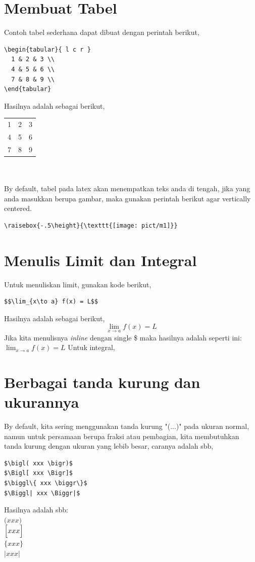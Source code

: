 \documentclass[12pt]{article}
\begin{document}
\section{Membuat Tabel}
Contoh tabel sederhana dapat dibuat dengan perintah berikut,
\begin{verbatim}
\begin{tabular}{ l c r }
  1 & 2 & 3 \\
  4 & 5 & 6 \\
  7 & 8 & 9 \\
\end{tabular}
\end{verbatim}
Hasilnya adalah sebagai berikut,\\
\begin{tabular}{ l c r }
  1 & 2 & 3 \\
  4 & 5 & 6 \\
  7 & 8 & 9 \\
\end{tabular}
\\
\\
By default, tabel pada latex akan menempatkan teks anda di tengah, jika yang anda masukkan berupa gambar, maka gunakan perintah berikut agar vertically centered.
\begin{verbatim}
\raisebox{-.5\height}{\texttt{[image: pict/m1]}}
\end{verbatim}

\section{Menulis Limit dan Integral}
Untuk menuliskan limit, gunakan kode berikut,
\begin{verbatim}
$$\lim_{x\to a} f(x) = L$$ 
\end{verbatim}
Hasilnya adalah sebagai berikut, \\
$$\lim_{x\to a} f(x) = L $$
Jika kita menulisnya \emph{inline} dengan single \$ maka hasilnya adalah seperti ini:
$\lim_{x\to a} f(x) = L$
Untuk integral,


\section{Berbagai tanda kurung dan ukurannya}
By default, kita sering menggunakan tanda kurung "(...)" pada ukuran normal, namun untuk persamaan berupa fraksi atau pembagian, kita membutuhkan tanda kurung dengan ukuran yang lebib besar, caranya adalah sbb,
\begin{verbatim}
$\bigl( xxx \bigr)$
$\Bigl[ xxx \Bigr]$
$\biggl\{ xxx \biggr\}$
$\Biggl| xxx \Biggr|$
\end{verbatim}
Hasilnya adalah sbb:\\
$\bigl( xxx \bigr)$ \\
$\Bigl[ xxx \Bigr]$  \\
$\biggl\{ xxx \biggr\}$ \\
$\Biggl| xxx \Biggr|$ 
\end{document}
